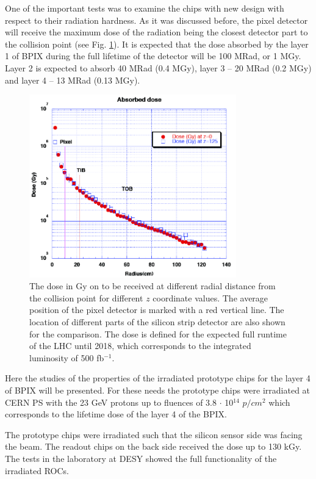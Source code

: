 One of the important tests was to examine the chips with new design with respect to their radiation hardness. As it was discussed before, the
pixel detector will receive the maximum dose of the radiation being the closest detector part to the collision point (see Fig. \ref{fig:irrad_dose}).
It is expected that the dose absorbed by the layer 1 of BPIX during the full lifetime of the detector will be 100 MRad, or 1 MGy. Layer 2 is 
expected to absorb 40 MRad (0.4 MGy), layer 3 -- 20 MRad (0.2 MGy) and layer 4 -- 13 MRad (0.13 MGy).

\begin{figure}[t]
 \centering
 \includegraphics[width=0.8\textwidth]{021_pixel_upgrade/plots/irradiation_dose.png}
 \caption{The dose in Gy on to be received at different radial distance from the collision point for different $z$ coordinate values. The 
 average position of the pixel detector is marked with a red vertical line. The location of different parts of the silicon strip detector
 are also shown for the comparison. The dose is defined for the expected full runtime of the LHC until 2018, which corresponds to the integrated
 luminosity of 500 fb$^{-1}$.}
 \label{fig:irrad_dose}
\end{figure}

Here the studies of the properties of the irradiated prototype chips for the layer 4 of BPIX will be presented. For these needs the prototype
chips were irradiated at CERN PS \cite{CERNTB} with the 23 GeV protons up to fluences of 3.8 $\cdot$ 10$^{14}$ $p/cm^{2}$ which corresponds to the lifetime
dose of the layer 4 of the BPIX. %

The prototype chips were irradiated such that the silicon sensor side was facing the beam. The readout chips on the back side received the dose
up to 130 kGy. The tests  in the laboratory at DESY \cite{DESYWeb} showed the full functionality of the irradiated ROCs.

